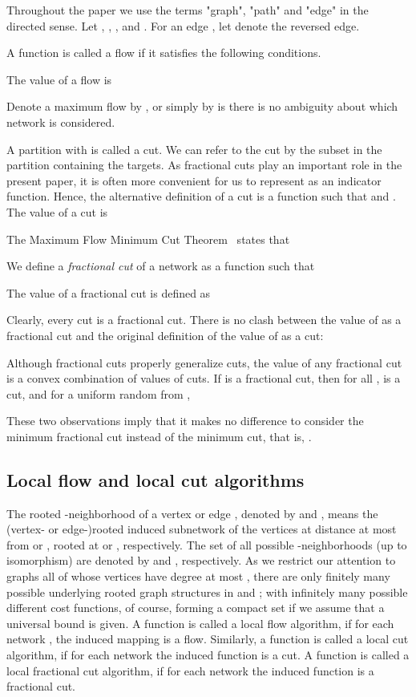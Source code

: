 \documentclass[12pt,a4paper]{article}
\renewcommand{\:}{\colon}
\begin{document}
Throughout the paper we use the terms "graph", "path" and "edge" in the directed sense. 
Let , , , and . 
For an edge , let  denote the reversed edge.

A function  is called a flow if it satisfies the following conditions.

The value of a flow  is

Denote a maximum flow by , or simply by  is there is no ambiguity about which network is considered.

A partition  with  is called a cut. 
We can refer to the cut by the subset  in the partition containing the targets. 
As fractional cuts play an important role in the present paper, it is often more convenient for us to represent  as an indicator function. 
Hence, the alternative definition of a cut is a function  such that  and .
The value of a cut is

The Maximum Flow Minimum Cut Theorem~\cite{FoFu} states that


We define a \emph{fractional cut} of a network  as a function  such that

The value of a fractional cut is defined as


Clearly, every cut  is a fractional cut. 
There is no clash between the value of  as a fractional cut and the original definition of the value of  as a cut: 

Although fractional cuts properly generalize cuts, the value of any fractional cut is a convex combination of values of cuts. 
If  is a fractional cut, then for all ,  is a cut, and for a uniform random  from ,



These two observations imply that it makes no difference to consider the minimum fractional cut instead of the minimum cut, that is, .


\subsection{Local flow and local cut algorithms}

The rooted -neighborhood of a vertex  or edge , denoted by  and , means the (vertex- or edge-)rooted induced subnetwork of the vertices at distance at most  from  or , rooted at  or , respectively. 
The set of all possible -neighborhoods (up to isomorphism) are denoted by  and , respectively. 
As we restrict our attention to graphs all of whose vertices have degree at most , there are only finitely many possible underlying rooted graph structures in  and ; with infinitely many possible different cost functions, of course, forming a compact set if we assume that a universal bound  is given. 
A function  is called a local flow algorithm, if for each network , the induced mapping  is a flow. 
Similarly, a function  is called a local cut algorithm, if for each network  the induced function  is a cut. 
A function  is called a local fractional cut algorithm, if for each network  the induced function  is a fractional cut. 
\end{document}
